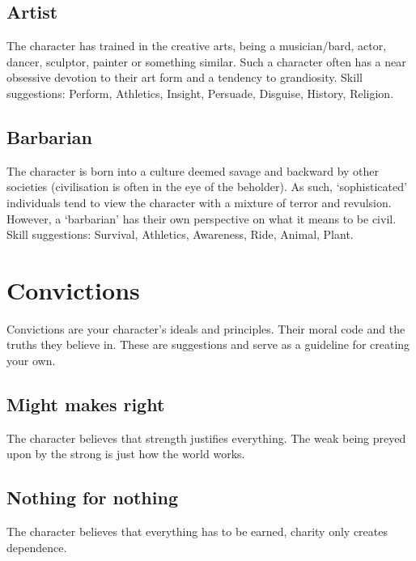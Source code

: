 \documentclass[a4paper,10pt,oneside]{book}
\begin{document}

\subsection{Artist}
The character has trained in the creative arts, being a musician/bard, actor, dancer, sculptor, painter or something similar. Such a character often has a near obsessive devotion to their art form and a tendency to grandiosity. Skill suggestions: Perform, Athletics, Insight, Persuade, Disguise, History, Religion.

\subsection{Barbarian}
The character is born into a culture deemed savage and backward by other societies (civilisation is often in the eye of the beholder). As such, `sophisticated' individuals tend to view the character with a mixture of terror and revulsion. However, a `barbarian' has their own perspective on what it means to be civil. Skill suggestions: Survival, Athletics, Awareness, Ride, Animal, Plant.



\section{Convictions}
\label{sec:convictions}
Convictions are your character's ideals and principles. Their moral code and the truths they believe in. These are suggestions and serve as a guideline for creating your own.

\subsection{Might makes right}
The character believes that strength justifies everything. The weak being preyed upon by the strong is just how the world works. 

\subsection{Nothing for nothing}
The character believes that everything has to be earned, charity only creates dependence.
\end{document}
